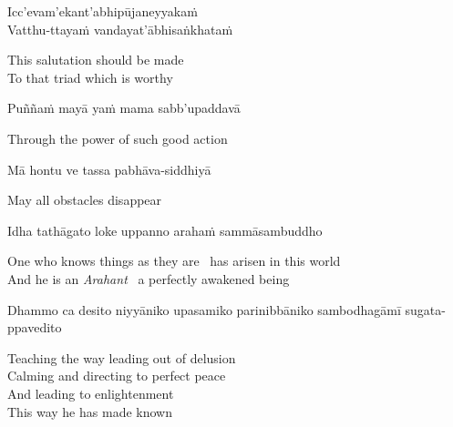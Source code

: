Icc'evam'ekant'abhipūjaneyyakaṁ\\
Vatthu-ttayaṁ vandayat'ābhisaṅkhataṁ

\begin{english}
  This salutation should be made\\
  To that triad\ifdigitalversion\makeatletter\hyperlink{endnote11-appendix}\makeatother\fi
  which is worthy
\end{english}

Puññaṁ mayā yaṁ mama sabb'upaddavā

\begin{english}
  Through the power of such good action
\end{english}

Mā hontu ve tassa pabhāva-siddhiyā

\begin{english}
  May all obstacles disappear
\end{english}

Idha tathāgato loke uppanno arahaṁ sammāsambuddho

\begin{english}
  One who knows things as they are \breathmark\ has arisen in this world\makeatletter\hyperlink{endnote12-appendix}\makeatother\\

  And he is an \textit{Arahant} \breathmark\ a perfectly awakened being
\end{english}

\begin{pali-hang}
  Dhammo ca desito niyyāniko upasamiko parinibbāniko sambodhagāmī sugata-ppavedito
\end{pali-hang}

\begin{english-verses}
  Teaching the way leading out of delusion\makeatletter\hyperlink{endnote13-appendix}\makeatother\\
  Calming and directing to perfect peace\\
  And leading to enlightenment\\
  This way he has made known\\
\end{english-verses}

